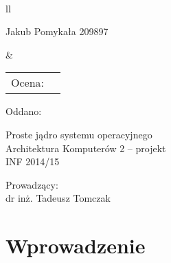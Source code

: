 \documentclass[a4paper,12pt]{article}
\begin{document}
\thispagestyle{empty}

\noindent
\unitlength=1mm
\fboxrule=1mm
\setlength{\fboxrule}{3pt}\\[+2mm]
\begin{tabular}{ll}
\begin{minipage}[t]{110mm}
{\LARGE\sf 
Jakub Pomykała 209897}
\end{minipage}
 &
\begin{minipage}[t]{55mm}
{\Large\sf 
\begin{tabular}{ll}
Ocena:  & \raisebox{-3mm}{\framebox(30,9)[cc]{}}\\
\end{tabular}
}
\end{minipage}
\end{tabular}

\hfill {\Large\sf Oddano: }\\[+10mm]

\begin{center}
{\huge\sf Proste jądro systemu operacyjnego}\\[+10mm]
{\Large\sc 
Architektura Komputerów 2 -- projekt\\
INF 2014/15\\[+10mm]}
\end{center}

\noindent
{\sc 
\hspace*{70mm}Prowadz\k{a}cy:\\
\hspace*{70mm}dr inż. Tadeusz Tomczak\\
}

\newpage
\tableofcontents %
\newpage
	
	\section{Wprowadzenie}
\end{document}
